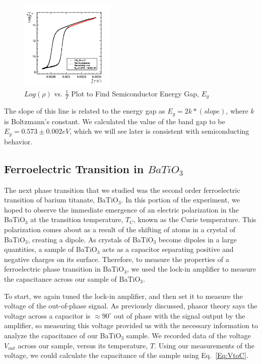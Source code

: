 \documentclass[%
 reprint,
 amsmath,amssymb,
 aps,
 pra,
]{revtex4-1}
\begin{document}
\begin{figure}[H]
	\centering
	\includegraphics[width=0.4\textwidth]{VO2_LogRvTInv.png}
	\caption{$Log(\rho)$ vs. $\frac{1}{T}$ Plot to Find Semiconductor Energy Gap, $E_{g}$}
	\label{Fig:RvT2}
\end{figure}

\noindent The slope of this line is related to the energy gap as $E_{g} = 2k*(slope)$, where $k$ is Boltzmann's constant. We calculated the value of the band gap to be $E_{g} = 0.573 \pm 0.002 eV$, which we will see later is consistent with semiconducting behavior.

\subsection{Ferroelectric Transition in $BaTiO_{3}$}

The next phase transition that we studied was the second order ferroelectric transition of barium titanate, BaTiO$_{3}$. In this portion of the experiment, we hoped to observe the immediate emergence of an electric polarization in the BaTiO$_{3}$ at the transition temperature, $T_{C}$, known as the Curie temperature. This polarization comes about as a result of the shifting of atoms in a crystal of BaTiO$_{3}$, creating a dipole. As crystals of BaTiO$_{3}$ become dipoles in a large quantities, a sample of BaTiO$_{3}$ acts as a capacitor separating positive and negative charges on its surface. Therefore, to measure the properties of a ferroelectric phase transition in BaTiO$_{3}$, we used the lock-in amplifier to measure the capacitance across our sample of BaTiO$_{3}$.

To start, we again tuned the lock-in amplifier, and then set it to measure the voltage of the out-of-phase signal. As previously discussed, phasor theory says the voltage across a capacitor is $\approx 90^\circ$ out of phase with the signal output by the amplifier, so measuring this voltage provided us with the necessary information to analyze the capacitance of our BaTiO$_{3}$ sample. We recorded data of the voltage $V_{out}$ across our sample, versus its temperature, $T$. Using our measurements of the voltage, we could calculate the capacitance of the sample using Eq.~\ref{Eq:VtoC}.
\end{document}
